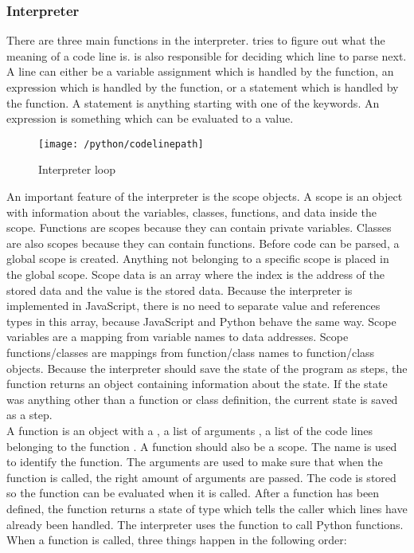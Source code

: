 \subsubsection{Interpreter}
There are three main functions in the interpreter.  tries to figure out what the meaning of a code line is.  is also responsible for deciding which line to parse next. A line can either be a variable assignment which is handled by the  function, an expression which is handled by the  function, or a statement which is handled by the  function. A statement is anything starting with one of the keywords. An expression is something which can be evaluated to a value.
\begin{figure}[H]
    \centering
    \texttt{[image: /python/codelinepath]}
    \caption{Interpreter loop}
    \label{fig:pythonCodeLinePath}
\end{figure}
\noindent
An important feature of the interpreter is the scope objects. A scope is an object with information about the variables, classes, functions, and data inside the scope. Functions are scopes because they can contain private variables. Classes are also scopes because they can contain functions. Before code can be parsed, a global scope is created. Anything not belonging to a specific scope is placed in the global scope. Scope data is an array where the index is the address of the stored data and the value is the stored data. Because the interpreter is implemented in JavaScript, there is no need to separate value and references types in this array, because JavaScript and Python behave the same way. Scope variables are a mapping from variable names to data addresses. Scope functions/classes are mappings from function/class names to function/class objects. Because the interpreter should save the state of the program as steps, the  function returns an object containing information about the state. If the state was anything other than a function or class definition, the current state is saved as a step.
\\[11pt]
A function is an object with a , a list of arguments , a list of the code lines belonging to the function . A function should also be a scope. The name is used to identify the function. The arguments are used to make sure that when the function is called, the right amount of arguments are passed. The code is stored so the function can be evaluated when it is called. After a function has been defined, the  function returns a state of type  which tells the caller which lines have already been handled. The interpreter uses the  function to call Python functions. When a function is called, three things happen in the following order:
